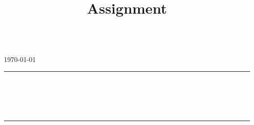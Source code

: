 \documentclass[a4paper,10pt]{article} %
\begin{document}




\title{Assignment} %
\fancyhead[C]{}
\begin{minipage}{0.295\textwidth} %
\raggedright
\myCourse %
\footnotesize
\hfill\\ %
\today %
\medskip\hrule
\end{minipage}
\begin{minipage}{0.4\textwidth} %
\centering
\large %
\myTitle \\
\normalsize %
\mySubTitle \\ %
\end{minipage}
\begin{minipage}{0.295\textwidth} %
\raggedleft
\myName %
\footnotesize
\hfill\\ %
\myEmail %
\medskip\hrule
\end{minipage}




\bigskip


\printbibliography

\end{document}
